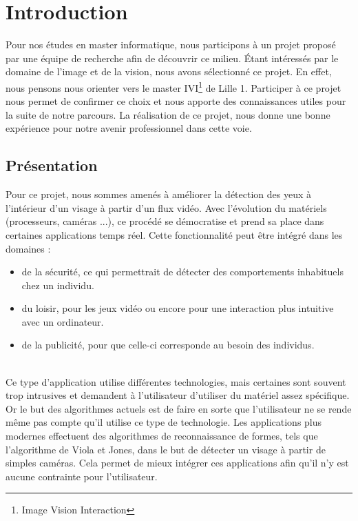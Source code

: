 \section{Introduction}

Pour nos études en master informatique, nous participons à un projet proposé par une 
équipe de recherche afin de découvrir ce milieu. 
Étant intéressés par le domaine de l'image et de la vision, nous avons sélectionné ce projet. 
En effet, nous pensons nous orienter vers le master IVI\footnote{Image Vision Interaction} de 
Lille 1. Participer à ce projet nous permet de confirmer ce choix et nous apporte des 
connaissances utiles pour la suite de notre parcours. La réalisation de ce projet, nous donne une bonne expérience pour notre 
avenir professionnel dans cette voie.\\

\subsection{Présentation}
Pour ce projet, nous sommes amenés à améliorer la détection des yeux à l'intérieur d'un visage à partir d'un flux vidéo.
Avec l'évolution du matériels (processeurs, caméras ...), ce procédé se démocratise et prend sa place 
dans certaines applications temps réel. Cette fonctionnalité peut être intégré dans les domaines : 
\begin{itemize}
 \item de la sécurité, ce qui permettrait de détecter des comportements inhabituels chez un individu.
 \item du loisir, pour les jeux vidéo ou encore pour une interaction plus intuitive avec un ordinateur.
 \item de la publicité, pour que celle-ci corresponde au besoin des individus. 
\end{itemize}
\ \\
Ce type d'application utilise différentes technologies, mais certaines sont souvent trop intrusives 
et demandent à l'utilisateur d'utiliser du matériel assez spécifique. Or le but des algorithmes actuels
est de faire en sorte que l'utilisateur ne se rende même pas compte qu'il utilise ce type de technologie. Les applications plus 
modernes effectuent des algorithmes de reconnaissance de formes, tels que l'algorithme de Viola et Jones, dans 
le but de détecter un visage à partir de simples caméras. Cela permet de mieux intégrer ces applications 
afin qu'il n'y est aucune contrainte pour l'utilisateur.\\

